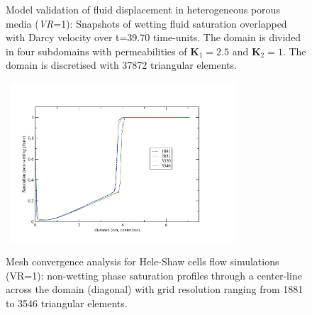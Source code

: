 \begin{landscape}
\begin{figure}[ht]
{       \vspace{0.cm}
    }  
\caption{Model validation of fluid displacement in heterogeneous porous media ({\it VR}=1): Snapshots of wetting fluid saturation overlapped with Darcy velocity over t=39.70 time-units. The domain is divided in four subdomains with permeabilities of $\mathbf{K}_{1}=2.5$ and $\mathbf{K}_{2}=1$. The domain is discretised with 37872  triangular elements. }
\label{DaweGrattoniExperiment_b}
  \end{figure}
\end{landscape}
\clearpage


\begin{figure}[h]
  \hbox{\hspace{2cm}
  \includegraphics[width=0.75\textwidth]{./Pics1/Saffman_homogeneous/MeshIndependence.pdf}}
  \caption{Mesh convergence analysis for Hele-Shaw cells flow simulations (VR=1): non-wetting phase saturation profiles through a center-line across the domain (diagonal) with grid resolution ranging from 1881 to 3546  triangular elements. }
\label{fig:MeshDependenceAnalysis}
\end{figure}
\clearpage


